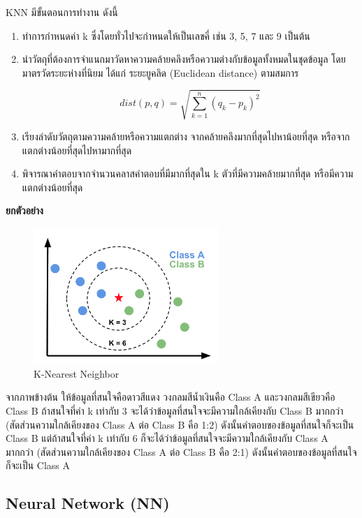 \documentclass[12pt,oneside,openright,a4paper]{cpe-thai-project}
\begin{document}
    KNN มีขั้นตอนการทำงาน ดังนี้
    \begin{enumerate}
      \item ทำการกำหนดค่า k ซึ่งโดยทั่วไปจะกำหนดให้เป็นเลขคี่ เช่น 3, 5, 7 และ 9 เป็นต้น
      \item นำวัตถุที่ต้องการจำแนกมาวัดหาความคล้ายคลึงหรือความต่างกับข้อมูลทั้งหมดในชุดข้อมูล 
            โดยมาตรวัดระยะห่างที่นิยม ได้แก่ ระยะยูคลิด (Euclidean distance) ตามสมการ 

            \[ dist\left( p,q\right)   = \sqrt {\sum _{k=1}^{n}  \left( q_{k}-p_{k}\right)^2 }  \]
      \item เรียงลำดับวัตถุตามความคล้ายหรือความแตกต่าง จากคล้ายคลึงมากที่สุดไปหาน้อยที่สุด หรือจากแตกต่างน้อยที่สุดไปหามากที่สุด
      \item พิจารณาคำตอบจากจำนวนคลาสคำตอบที่มีมากที่สุดใน k ตัวที่มีความคล้ายมากที่สุด หรือมีความแตกต่างน้อยที่สุด
    \end{enumerate}
    \textbf{ยกตัวอย่าง} 
    \begin{figure}[!ht]\centering
      \includegraphics[width=7cm]{./img/knn.png}
      \caption{K-Nearest Neighbor}\label{fig:knn}
    \end{figure}

    \hspace{1cm}จากภาพข้างต้น ให้ข้อมูลที่สนใจคือดาวสีแดง วงกลมสีน้ำเงินคือ Class A และวงกลมสีเขียวคือ Class B ถ้าสนใจที่ค่า k เท่ากับ 3 
    จะได้ว่าข้อมูลที่สนใจจะมีความใกล้เคียงกับ Class B มากกว่า (สัดส่วนความใกล้เคียงของ Class A ต่อ Class B คือ 1:2) ดังนั้นคำตอบของข้อมูลที่สนใจก็จะเป็น Class B
    แต่ถ้าสนใจที่ค่า k เท่ากับ 6 ก็จะได้ว่าข้อมูลที่สนใจจะมีความใกล้เคียงกับ Class A มากกว่า (สัดส่วนความใกล้เคียงของ Class A ต่อ Class B คือ 2:1) ดังนั้นคำตอบของข้อมูลที่สนใจก็จะเป็น Class A 
  \subsection{Neural Network (NN)}
\end{document}
